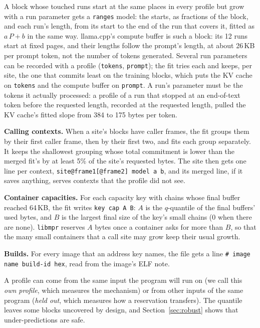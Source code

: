 \documentclass[11pt]{article}
\newcommand{\libmpr}{\texttt{libmpr}}
\newcommand{\secref}[1]{Section~\ref{#1}}
\newcommand{\term}[1]{\emph{#1}}
\begin{document}
A block whose touched runs start at the same places in every profile but grow with a run parameter gets a
\texttt{ranges} model: the starts, as fractions of the block, and each run's length, from its start to the end of
the run that covers it, fitted as $a\,P + b$ in the same way. llama.cpp's compute buffer is such a block: its 12
runs start at fixed pages, and their lengths follow the prompt's length, at about 26\,KB per prompt token, not the
number of tokens generated. Several run parameters can be recorded with a profile (\texttt{tokens}, \texttt{prompt});
the fit tries each and keeps, per site, the one that commits least on the training blocks, which puts the KV cache
on \texttt{tokens} and the compute buffer on \texttt{prompt}. A run's parameter must be the tokens it actually
processed: a profile of a run that stopped at an end-of-text token before the requested length, recorded at the
requested length, pulled the KV cache's fitted slope from 384 to 175 bytes per token.

\textbf{Calling contexts.} When a site's blocks have caller frames, the fit groups them by their first caller
frame, then by their first two, and fits each group separately. It keeps the shallowest grouping whose total
commitment is lower than the merged fit's by at least 5\% of the site's requested bytes. The site then gets one
line per context, \texttt{site@frame1[@frame2] model a b}, and its merged line, if it saves anything, serves
contexts that the profile did not see.

\textbf{Container capacities.} For each capacity key with chains whose final buffer reached 64\,KB, the fit
writes \texttt{key cap A B}: $A$ is the $q$-quantile of the final buffers' used bytes, and $B$ is the largest final
size of the key's small chains (0 when there are none). \libmpr{} reserves $A$ bytes once a container asks for
more than $B$, so that the many small containers that a call site may grow keep their usual growth.

\textbf{Builds.} For every image that an address key names, the file gets a line \texttt{\# image name build-id
hex}, read from the image's ELF note.

A profile can come from the same input the program will run on (we call this \term{own profile}, which
measures the mechanism) or from other inputs of the same program (\term{held out}, which measures how a
reservation transfers). The quantile leaves some blocks uncovered by design, and \secref{sec:robust} shows that
under-predictions are safe.
\end{document}
